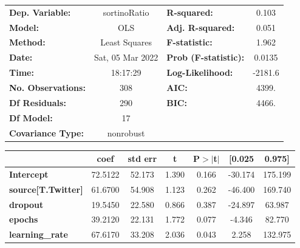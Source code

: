 \begin{center}
\begin{tabular}{lclc}
\toprule
\textbf{Dep. Variable:}                   &   sortinoRatio   & \textbf{  R-squared:         } &     0.103   \\
\textbf{Model:}                           &       OLS        & \textbf{  Adj. R-squared:    } &     0.051   \\
\textbf{Method:}                          &  Least Squares   & \textbf{  F-statistic:       } &     1.962   \\
\textbf{Date:}                            & Sat, 05 Mar 2022 & \textbf{  Prob (F-statistic):} &   0.0135    \\
\textbf{Time:}                            &     18:17:29     & \textbf{  Log-Likelihood:    } &   -2181.6   \\
\textbf{No. Observations:}                &         308      & \textbf{  AIC:               } &     4399.   \\
\textbf{Df Residuals:}                    &         290      & \textbf{  BIC:               } &     4466.   \\
\textbf{Df Model:}                        &          17      & \textbf{                     } &             \\
\textbf{Covariance Type:}                 &    nonrobust     & \textbf{                     } &             \\
\bottomrule
\end{tabular}
\begin{tabular}{lcccccc}
                                          & \textbf{coef} & \textbf{std err} & \textbf{t} & \textbf{P$> |$t$|$} & \textbf{[0.025} & \textbf{0.975]}  \\
\midrule
\textbf{Intercept}                        &      72.5122  &       52.173     &     1.390  &         0.166        &      -30.174    &      175.199     \\
\textbf{source[T.Twitter]}                &      61.6700  &       54.908     &     1.123  &         0.262        &      -46.400    &      169.740     \\
\textbf{dropout}                          &      19.5450  &       22.580     &     0.866  &         0.387        &      -24.897    &       63.987     \\
\textbf{epochs}                           &      39.2120  &       22.131     &     1.772  &         0.077        &       -4.346    &       82.770     \\
\textbf{learning\_rate}                   &      67.6170  &       33.208     &     2.036  &         0.043        &        2.258    &      132.975     \\

\end{tabular}
\end{center}
